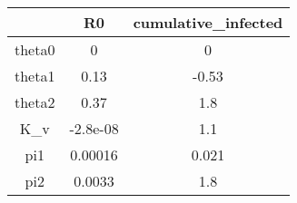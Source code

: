 \begin{tabular}{|c|c|c|}
\hline
& R0 & cumulative_infected \\
\hline
theta0 & 0 & 0 \\
\hline
theta1 & 0.13 & -0.53 \\
\hline
theta2 & 0.37 & 1.8 \\
\hline
K_v & -2.8e-08 & 1.1 \\
\hline
pi1 & 0.00016 & 0.021 \\
\hline
pi2 & 0.0033 & 1.8 \\
\hline
\end{tabular}
